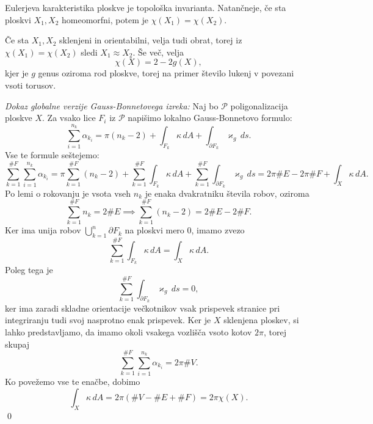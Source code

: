\begin{izrek}
\label{izr_Eulerjeva_karakteristika_je_topoloska_invarianta}
Eulerjeva karakteristika ploskve je topološka invarianta. Natančneje, če sta ploskvi $X_1, X_2$ homeomorfni, potem 
je $\chi(X_1) = \chi(X_2)$. 
\end{izrek}

Če sta $X_1, X_2$ sklenjeni in orientabilni, velja tudi obrat, torej iz $\chi(X_1) = \chi(X_2)$ sledi $X_1 \approx X_2$. Še več, velja \begin{equation*}
\chi(X) = 2 - 2g(X),
\end{equation*}  
kjer je $g$ genus oziroma rod ploskve, torej na primer število lukenj v povezani vsoti torusov.

\noindent
{\em Dokaz globalne verzije Gauss-Bonnetovega izreka:\/}
Naj bo $\mathcal{P}$ poligonalizacija ploskve $X$. Za vsako lice $F_i$ iz $\mathcal{P}$ napišimo lokalno Gauss-Bonnetovo formulo:
\begin{equation*}
\sum_{i = 1}^{n_k} \alpha_{k_i} = \pi(n_k - 2) + \int_{F_k} \kappa \, dA + \int_{\partial F_k } \varkappa_g \, ds.  
\end{equation*}  
Vse te formule seštejemo: \begin{equation*}
\sum_{k = 1}^{\#F} \sum_{i = 1}^{n_k} \alpha_{k_i} = \pi \sum_{k = 1}^{\#F}  (n_k - 2) + \sum_{k = 1}^{\#F}  \int_{F_k} \kappa \, dA + \sum_{k = 1}^{\#F}  \int_{\partial F_k } \varkappa_g \, ds = 2 \pi \#E - 2\pi \# F + \int_{X} \kappa \, dA. 
\end{equation*}  
Po lemi o rokovanju je vsota vseh $n_k$ je enaka dvakratniku števila robov, oziroma \begin{equation*}
    \sum_{k = 1}^{\#F} n_k = 2 \# E \implies \sum_{k = 1}^{\#F}  (n_k - 2) = 2 \# E - 2 \# F.
\end{equation*}  
  Ker ima unija robov $\bigcup_{k = 1}^{n} \partial F_k$ na ploskvi mero $0$, imamo zvezo \begin{equation*}
    \sum_{k = 1}^{\#F}  \int_{F_k} \kappa \, dA = \int_{X} \kappa \, dA.  
  \end{equation*}  
Poleg tega je\begin{equation*}
    \sum_{k = 1}^{\#F} \int_{\partial F_k} \varkappa_g \, ds = 0, 
\end{equation*}  
ker ima zaradi skladne orientacije večkotnikov vsak prispevek stranice pri integriranju tudi svoj nasprotno enak prispevek. 
Ker je $X$ sklenjena ploskev, si lahko predstavljamo, da imamo okoli vsakega vozlišča vsoto kotov $2 \pi$, torej skupaj \begin{equation*}
    \sum_{k = 1}^{\#F} \sum_{i = 1}^{n_k} \alpha_{k_i} = 2 \pi \# V.
\end{equation*}  
Ko povežemo vse te enačbe, dobimo \begin{equation*}
\int_{X} \kappa \, dA = 2 \pi (\# V - \# E + \# F ) = 2 \pi \chi(X). 
\end{equation*} 
 \qed

